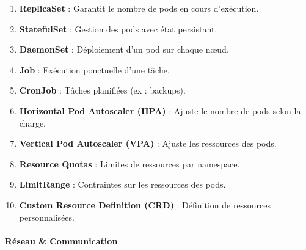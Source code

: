 \documentclass[
  letterpaper,
  DIV=11,
  numbers=noendperiod]{scrartcl}
\makeatletter
\let\oldparagraph\paragraph
\renewcommand{\paragraph}{
    \@ifstar
      \xxxParagraphStar
      \xxxParagraphNoStar
  }
\newcommand{\xxxParagraphStar}[1]{\oldparagraph*{#1}\mbox{}}
\newcommand{\xxxParagraphNoStar}[1]{\oldparagraph{#1}\mbox{}}
\providecommand{\tightlist}{%
  \setlength{\itemsep}{0pt}\setlength{\parskip}{0pt}}\usepackage{longtable,booktabs,array}
\makeatother
\begin{document}
\begin{enumerate}
\def\labelenumi{\arabic{enumi}.}
\setcounter{enumi}{20}
\tightlist
\item
  \textbf{ReplicaSet} : Garantit le nombre de pods en cours
  d'exécution.\\
\item
  \textbf{StatefulSet} : Gestion des pods avec état persistant.\\
\item
  \textbf{DaemonSet} : Déploiement d'un pod sur chaque nœud.\\
\item
  \textbf{Job} : Exécution ponctuelle d'une tâche.\\
\item
  \textbf{CronJob} : Tâches planifiées (ex : backups).\\
\item
  \textbf{Horizontal Pod Autoscaler (HPA)} : Ajuste le nombre de pods
  selon la charge.\\
\item
  \textbf{Vertical Pod Autoscaler (VPA)} : Ajuste les ressources des
  pods.\\
\item
  \textbf{Resource Quotas} : Limites de ressources par namespace.\\
\item
  \textbf{LimitRange} : Contraintes sur les ressources des pods.\\
\item
  \textbf{Custom Resource Definition (CRD)} : Définition de ressources
  personnalisées.
\end{enumerate}

\paragraph{\texorpdfstring{\textbf{Réseau \&
Communication}}{Réseau \& Communication}}\label{ruxe9seau-communication}
\end{document}
